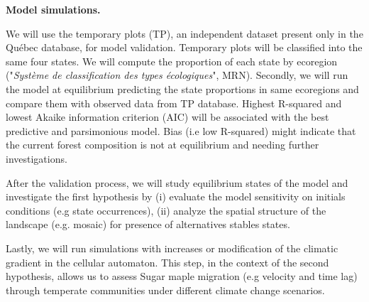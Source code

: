 

\textbf{Model simulations.} 


We will use the temporary plots (TP), an
independent  dataset present only in the Québec database, for model
validation. Temporary plots will be classified into the same four states. We
will compute the proportion of each state by ecoregion ("\textit{Système de
classification des types écologiques}", MRN). Secondly, we will run the model
at equilibrium predicting the state proportions in same ecoregions and compare
them with observed data from TP database. Highest R-squared and lowest Akaike
information criterion (AIC) will be associated with the best predictive and
parsimonious model. Bias (i.e low R-squared) might indicate that the current
forest composition is not at equilibrium and needing further investigations.


After the validation process, we will study equilibrium states of the model
and investigate the first hypothesis by (i) evaluate the model sensitivity on
initials conditions (e.g state occurrences), (ii) analyze the spatial
structure of the landscape (e.g. mosaic) for presence of alternatives stables
states. 


Lastly, we will run simulations with increases or modification of the
climatic gradient in the cellular automaton. This step, in the context of the
second hypothesis, allows us to assess Sugar maple migration (e.g velocity and
time lag) through  temperate communities under different climate change
scenarios.


\clearpage
\small

